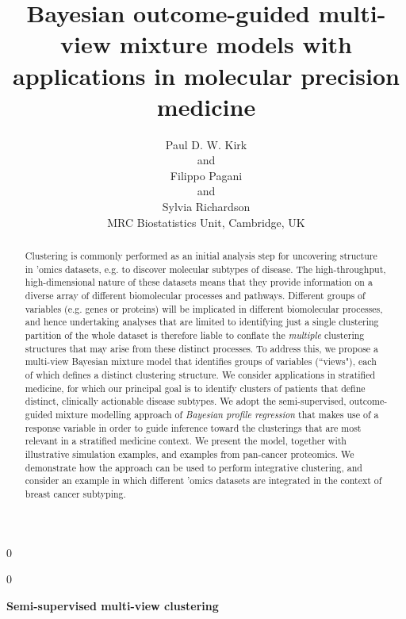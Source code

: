 \documentclass[12pt]{article}
\newcommand{\blind}{0}
\begin{document}
%

\def\spacingset#1{\renewcommand{\baselinestretch}%
{#1}\small\normalsize} \spacingset{1}



\blind
{
  \title{\bf Bayesian outcome-guided multi-view mixture models with applications in molecular precision medicine}
  \author{Paul D. W. Kirk\\%
    and \\
    Filippo Pagani \\
    and \\
    Sylvia Richardson \\
    MRC Biostatistics Unit, Cambridge, UK}
  \maketitle
} \fi

\blind
{
  \bigskip
  \bigskip
  \bigskip
  \begin{center}
    {\LARGE\bf Semi-supervised multi-view clustering}
\end{center}
  \medskip
} \fi

\bigskip
\begin{abstract}
Clustering is commonly performed as an initial analysis step for uncovering structure in 'omics datasets, e.g. to discover molecular subtypes of disease.  The high-throughput, high-dimensional nature of these datasets means that they provide information on a diverse array of different biomolecular processes and pathways.  Different groups of variables (e.g. genes or proteins) will be implicated in different biomolecular processes, and hence undertaking analyses that are limited to identifying just a single clustering partition of the whole dataset is therefore liable to conflate the {\em multiple} clustering structures that may arise from these distinct processes.  To address this, we propose a multi-view Bayesian mixture model that identifies groups of variables (``views"), each of which defines a distinct clustering structure.  We consider applications in stratified medicine, for which our principal goal is to identify clusters of patients that define distinct, clinically actionable disease subtypes.  We adopt the semi-supervised, outcome-guided mixture modelling approach of {\em Bayesian profile regression} that makes use of a response variable in order
to guide inference toward the clusterings that are most relevant in a stratified medicine context.  We present the model, together with
illustrative simulation examples, and examples from pan-cancer proteomics. We demonstrate how the approach can be used to perform integrative clustering, and consider an example in which different 'omics datasets are integrated in the context of breast cancer subtyping. %
\end{abstract}
\end{document}
